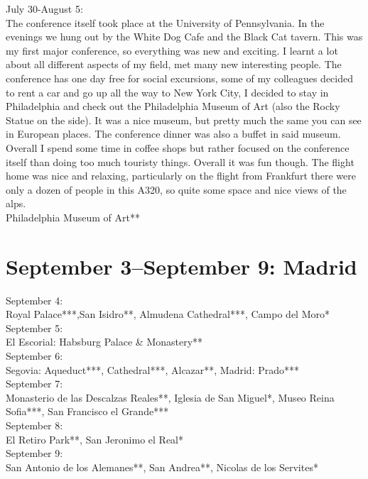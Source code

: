 July 30-August 5:\\
The conference itself took place at the University of Pennsylvania. In the evenings we hung out by the White Dog Cafe and the Black Cat tavern. This was my first major conference, so everything was new and exciting. I learnt a lot about all different aspects of my field, met many new interesting people. The conference has one day free for social excursions, some of my colleagues decided to rent a car and go up all the way to New York City, I decided to stay in Philadelphia and check out the Philadelphia Museum of Art (also the Rocky Statue on the side). It was a nice museum, but pretty much the same you can see in European places. The conference dinner was also a buffet in said museum. Overall I spend some time in coffee shops but rather focused on the conference itself than doing too much touristy things. Overall it was fun though. The flight home was nice and relaxing, particularly on the flight from Frankfurt there were only a dozen of people in this A320, so quite some space and nice views of the alps.\\

Philadelphia Museum of Art**

\section{September 3--September 9: Madrid}
\label{2008:Madrid}

September 4:\\
Royal Palace***,San Isidro**, Almudena Cathedral***, Campo del Moro*\\

September 5:\\
El Escorial: Habsburg Palace \& Monastery**\\

September 6:\\
Segovia: Aqueduct***, Cathedral***, Alcazar**, Madrid: Prado***\\

September 7:\\
Monasterio de las Descalzas Reales**, Iglesia de San Miguel*, Museo Reina Sofia***, San Francisco el Grande***\\

September 8:\\
El Retiro Park**, San Jeronimo el Real*\\

September 9:\\
San Antonio de los Alemanes**, San Andrea**, Nicolas de los Servites*


